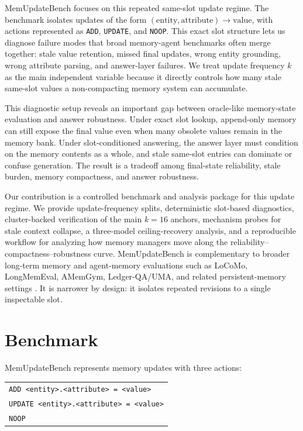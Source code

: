 \documentclass[11pt]{article}
\begin{document}
MemUpdateBench focuses on this repeated same-slot update regime. The benchmark isolates updates of the form \((\mathrm{entity}, \mathrm{attribute}) \rightarrow \mathrm{value}\), with actions represented as \texttt{ADD}, \texttt{UPDATE}, and \texttt{NOOP}. This exact slot structure lets us diagnose failure modes that broad memory-agent benchmarks often merge together: stale value retention, missed final updates, wrong entity grounding, wrong attribute parsing, and answer-layer failures. We treat update frequency \(k\) as the main independent variable because it directly controls how many stale same-slot values a non-compacting memory system can accumulate.

This diagnostic setup reveals an important gap between oracle-like memory-state evaluation and answer robustness. Under exact slot lookup, append-only memory can still expose the final value even when many obsolete values remain in the memory bank. Under slot-conditioned answering, the answer layer must condition on the memory contents as a whole, and stale same-slot entries can dominate or confuse generation. The result is a tradeoff among final-state reliability, stale burden, memory compactness, and answer robustness.

Our contribution is a controlled benchmark and analysis package for this update regime. We provide update-frequency splits, deterministic slot-based diagnostics, cluster-backed verification of the main \(k=16\) anchors, mechanism probes for stale context collapse, a three-model ceiling-recovery analysis, and a reproducible workflow for analyzing how memory managers move along the reliability--compactness--robustness curve. MemUpdateBench is complementary to broader long-term memory and agent-memory evaluations such as LoCoMo, LongMemEval, AMemGym, Ledger-QA/UMA, and related persistent-memory settings \citep{locomo,longmemeval,amemgym,ledgerqa_uma}. It is narrower by design: it isolates repeated revisions to a single inspectable slot.

\section{Benchmark}

MemUpdateBench represents memory updates with three actions:
\begin{center}
\begin{tabular}{l}
\texttt{ADD <entity>.<attribute> = <value>} \\
\texttt{UPDATE <entity>.<attribute> = <value>} \\
\texttt{NOOP}
\end{tabular}
\end{center}
\end{document}
